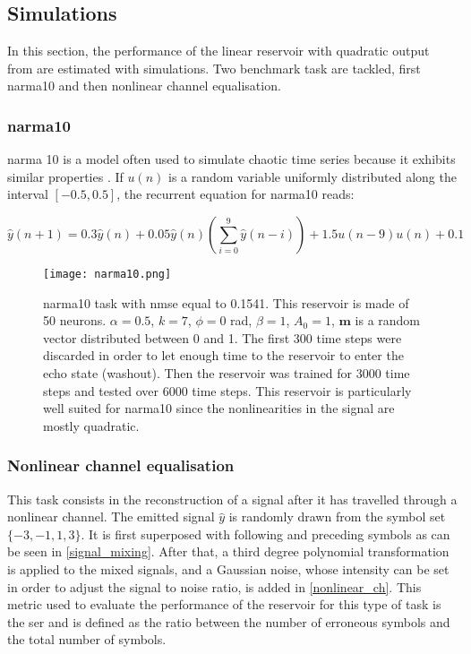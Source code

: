 
\subsection{Simulations}

In this section, the performance of the linear reservoir with quadratic output from \cite{Vinckier2015} are estimated with simulations. Two benchmark task are tackled, first \acrshort{narma}10 and then nonlinear channel equalisation.


\subsubsection{\acrshort{narma}10}

\gls{narma}  10 is a model often used to simulate chaotic time series because it exhibits similar properties \cite{Paquot2012}. If $u(n)$ is a random variable uniformly distributed along the interval $[-0.5, 0.5]$, the recurrent equation for \gls{narma}10 reads:

\begin{equation}
	\hat{y}(n+1) = 0.3\hat{y}(n)+0.05\hat{y}(n)\left(\sum_{i=0}^9 \hat{y}(n-i) \right)+1.5u(n-9)u(n)+0.1
\end{equation}

\begin{figure}[h]
	\centering
	\texttt{[image: narma10.png]}
	\caption{\gls{narma}10 task with \gls{nmse} equal to 0.1541. This reservoir is made of 50 neurons. $\alpha=0.5$, $k=7$, $\phi=0$ rad, $\beta=1$, $A_0=1$, $\mathbf{m}$ is a random vector distributed between 0 and 1. The first 300 time steps were discarded in order to let enough time to the reservoir to enter the echo state (washout). Then the reservoir was trained for 3000 time steps and tested over 6000 time steps. This reservoir is particularly well suited for  \gls{narma}10 since the nonlinearities in the signal are mostly quadratic.}
	\label{narma10}
\end{figure}


\newpage

\subsubsection{Nonlinear channel equalisation}

This task consists in the reconstruction of a signal after it has travelled through a nonlinear channel. The emitted signal $\hat{y}$ is randomly drawn from the symbol set $\{-3,-1,1,3\}$. It is first superposed with following and preceding symbols as can be seen in \eqref{signal_mixing}. After that, a third degree polynomial transformation is applied to the mixed signals, and a Gaussian noise, whose intensity can be set in order to adjust the signal to noise ratio, is added in \eqref{nonlinear_ch}. This metric used to evaluate the performance of the reservoir for this type of task is the \gls{ser} and is defined as the ratio between the number of erroneous symbols and the total number of symbols.

